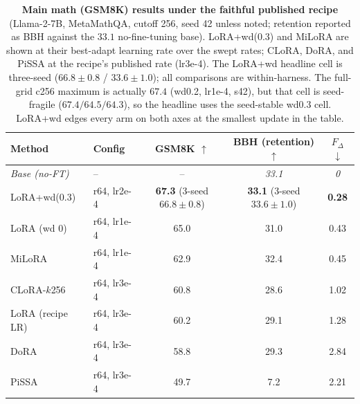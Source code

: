 \documentclass[11pt]{article}
\newcommand{\dw}{F_{\Delta}}
\begin{document}
\begin{table}[t]
  \centering
  \begin{tabular}{l l c c c}
  \toprule
  Method & Config & GSM8K $\uparrow$ & BBH (retention) $\uparrow$ & $\dw$ $\downarrow$ \\
  \midrule
  \textit{Base (no-FT)} & -- & -- & \textit{33.1} & \textit{0} \\
  \midrule
  LoRA+wd(0.3) & r64, lr2e-4 & \textbf{67.3} {\footnotesize(3-seed $66.8\!\pm\!0.8$)} & \textbf{33.1} {\footnotesize(3-seed $33.6\!\pm\!1.0$)} & \textbf{0.28} \\
  LoRA (wd 0)  & r64, lr1e-4 & 65.0 & 31.0 & 0.43 \\
  MiLoRA       & r64, lr1e-4 & 62.9 & 32.4 & 0.45 \\
  CLoRA-$k$256 & r64, lr3e-4 & 60.8 & 28.6 & 1.02 \\
  LoRA (recipe LR) & r64, lr3e-4 & 60.2 & 29.1 & 1.28 \\
  DoRA         & r64, lr3e-4 & 58.8 & 29.3 & 2.84 \\
  PiSSA        & r64, lr3e-4 & 49.7 & 7.2  & 2.21 \\
  \bottomrule
  \end{tabular}
  \caption{\textbf{Main math (GSM8K) results under the faithful published recipe}
  (Llama-2-7B, MetaMathQA, cutoff 256, seed 42 unless noted; retention reported
  as BBH against the $33.1$ no-fine-tuning base). LoRA{+}wd(0.3) and MiLoRA are
  shown at their best-adapt learning rate over the swept rates; CLoRA, DoRA, and
  PiSSA at the recipe's published rate (lr3e-4). The LoRA{+}wd headline cell is
  three-seed ($66.8\!\pm\!0.8$ / $33.6\!\pm\!1.0$); all comparisons are
  within-harness. The full-grid c256 maximum is actually $67.4$ (wd0.2, lr1e-4,
  s42), but that cell is seed-fragile ($67.4/64.5/64.3$), so the headline uses
  the seed-stable wd0.3 cell. LoRA{+}wd edges every arm on both axes at the
  smallest update in the table.}
  \label{tab:math}
\end{table}
\end{document}
